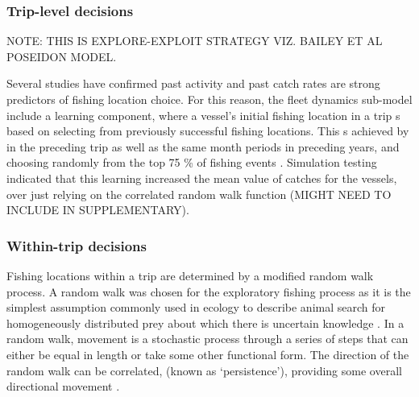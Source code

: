 \documentclass[review]{elsarticle}
\begin{document}
\subsubsection{Trip-level decisions}

NOTE: THIS IS EXPLORE-EXPLOIT STRATEGY VIZ. BAILEY ET AL POSEIDON MODEL.

Several studies \citep[e.g.][]{Hutton2004, Tidd2012, Girardin2015} have
confirmed past activity and past catch rates are strong predictors of fishing
location choice. For this reason, the fleet dynamics sub-model
include a learning component, where a vessel's initial
fishing location in a trip s based on selecting from
previously successful fishing locations. This s achieved
by  in the preceding trip as well as the same
month periods in preceding years, and choosing randomly from the top 75 \% of
fishing events .
 Simulation testing
indicated that this learning increased the mean value of catches for the
vessels, over just relying on the correlated random walk
 function  (MIGHT NEED TO INCLUDE
IN SUPPLEMENTARY). 

\subsubsection{Within-trip decisions}

Fishing locations within a trip are  determined by a
modified random walk process.  A random walk was
chosen for the exploratory fishing process as it is the simplest assumption
commonly used in ecology to describe  animal
 search for
 homogeneously distributed prey about which there is
uncertain knowledge \citep{Viswanathan1999}. In a random walk, movement is a
stochastic process through a series of steps that can either be equal in length or take
some other functional form. The direction of the random walk can be correlated,
(known as `persistence'), providing some overall 
directional movement \citep{Codling2008} . \\
\end{document}
